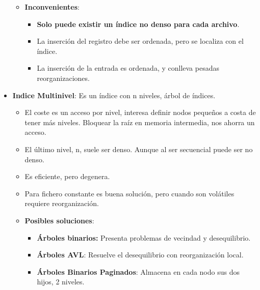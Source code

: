 \documentclass[12pt, twoside, openright]{report} %
\begin{document}
\begin{itemize}
\begin{itemize}
\begin{itemize}
      \end{itemize}
    \item \textbf{Inconvenientes}:
      

      \begin{itemize}
      \item \textbf{Solo puede existir un índice no denso para cada
        archivo}.
        
      \item La inserción del registro debe ser ordenada, pero se localiza
        con el índice.
        
      \item La inserción de la entrada es ordenada, y conlleva pesadas
        reorganizaciones.
        
      \end{itemize}
    \end{itemize}
	\pagebreak
  \item \textbf{Indice Multinivel}: Es un índice con n niveles, árbol de
    índices.
    

    \begin{itemize}
    \item El coste es un acceso por nivel, interesa definir nodos pequeños a
      costa de tener más niveles. Bloquear la raíz en memoria
      intermedia, nos ahorra un acceso.
      
    \item El último nivel, n, suele ser denso. Aunque al ser secuencial
      puede ser no denso.
      
    \item Es eficiente, pero degenera.
      
    \item Para fichero constante es buena solución, pero cuando son
      volátiles requiere reorganización.
      
    \item \textbf{Posibles soluciones}:
      

      \begin{itemize}
      \item \textbf{Árboles binarios:} Presenta problemas de vecindad y
        desequilibrio.
        
      \item \textbf{Árboles AVL}: Resuelve el desequilibrio con
        reorganización local.
        
      \item \textbf{Árboles Binarios Paginados}: Almacena en cada nodo sus
        dos hijos, 2 niveles.
        

\end{itemize}
\end{itemize}
\end{itemize}
\end{document}
